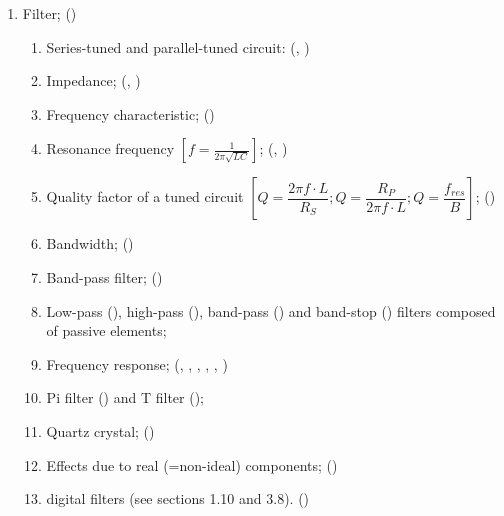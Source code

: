 \begin{flushleft}
\begin{enumerate}
\begin{enumerate}
\item Filter; ()\label{HAREC.a.3.2}
\begin{enumerate}
\item Series-tuned and parallel-tuned circuit:
  (, )\label{HAREC.a.3.2.1}
\item Impedance;
  (, )\label{HAREC.a.3.2.2}
\item Frequency characteristic;  ()\label{HAREC.a.3.2.3}
\item Resonance frequency \(\left[f=\frac{1}{2\pi\sqrt{LC}}\right]\);
  (, )\label{HAREC.a.3.2.4}
\item Quality factor of a tuned circuit
  \(\left[Q=\dfrac{2\pi f \cdot L}{R_S};
    Q=\dfrac{R_P}{2\pi f \cdot L}; Q=\dfrac{f_{res}}{B}\right]\);
  ()\label{HAREC.a.3.2.5}
\item Bandwidth; ()\label{HAREC.a.3.2.6}
\item Band-pass filter; ()\label{HAREC.a.3.2.7}
\item Low-pass ()\label{HAREC.a.3.2.8a},
  high-pass ()\label{HAREC.a.3.2.8b},
  band-pass ()\label{HAREC.a.3.2.8c}
  and band-stop ()\label{HAREC.a.3.2.8d}
  filters composed of passive elements;
\item Frequency response; (, ,
  , , ,
  )\label{HAREC.a.3.2.9}
\item Pi filter ()\label{HAREC.a.3.2.10a}
  and T filter ()\label{HAREC.a.3.2.10b};
\item Quartz crystal; ()\label{HAREC.a.3.2.11}
\item Effects due to real (=non-ideal) components;
  ()\label{HAREC.a.3.2.12}
\item digital filters (see sections 1.10 and 3.8).
  ()\label{HAREC.a.3.2.13}
\end{enumerate}


\end{enumerate}
\end{enumerate}
\end{flushleft}
